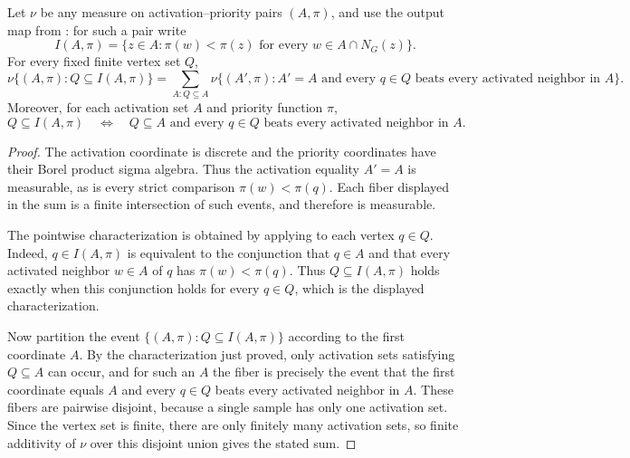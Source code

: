 \begin{helper}
Let $\nu$ be any measure on activation--priority pairs $(A,\pi)$, and use the
output map from : for such a pair write
\[
I(A,\pi)=\{z\in A:\pi(w)<\pi(z)\text{ for every }w\in A\cap N_G(z)\}.
\]
For every fixed finite vertex set $Q$,
\[
\nu\{(A,\pi):Q\subseteq I(A,\pi)\}
=\sum_{A:Q\subseteq A}
\nu\{(A',\pi):A'=A\text{ and every }q\in Q\text{ beats every activated
neighbor in }A\}.
\]
Moreover, for each activation set $A$ and priority function $\pi$,
\[
Q\subseteq I(A,\pi)
\quad\Longleftrightarrow\quad
Q\subseteq A\text{ and every }q\in Q\text{ beats every activated neighbor
in }A.
\]
\end{helper}
\begin{proof}
The activation coordinate is discrete and the priority coordinates have
their Borel product sigma algebra. Thus the activation equality $A'=A$
is measurable, as is every strict comparison $\pi(w)<\pi(q)$.
Each fiber displayed in the sum is a finite intersection of such events,
and therefore is measurable.

The pointwise characterization is obtained by applying
 to each vertex $q\in Q$.
Indeed, $q\in I(A,\pi)$ is equivalent to the conjunction that $q\in A$ and
that every activated neighbor $w\in A$ of $q$ has $\pi(w)<\pi(q)$.  Thus
$Q\subseteq I(A,\pi)$ holds exactly when this conjunction holds for every
$q\in Q$, which is the displayed characterization.

Now partition the event $\{(A,\pi):Q\subseteq I(A,\pi)\}$ according to the
first coordinate $A$.  By the characterization just proved, only activation
sets satisfying $Q\subseteq A$ can occur, and for such an $A$ the fiber is
precisely the event that the first coordinate equals $A$ and every
$q\in Q$ beats every activated neighbor in $A$.  These fibers are pairwise
disjoint, because a single sample has only one activation set.  Since the
vertex set is finite, there are only finitely many activation sets, so finite
additivity of $\nu$ over this disjoint union gives the stated sum.
\end{proof}

